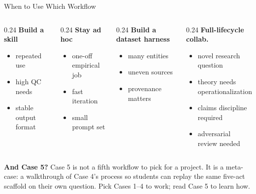 \documentclass[10pt,english,aspectratio=169]{beamer}
\begin{document}
\begin{frame}{When to Use Which Workflow}
\begin{columns}[T]
\begin{column}{0.24\textwidth}
\textbf{Build a skill}
\begin{itemize}\small
    \item repeated use
    \item high QC needs
    \item stable output format
\end{itemize}
\end{column}
\begin{column}{0.24\textwidth}
\textbf{Stay ad hoc}
\begin{itemize}\small
    \item one-off empirical job
    \item fast iteration
    \item small prompt set
\end{itemize}
\end{column}
\begin{column}{0.24\textwidth}
\textbf{Build a dataset harness}
\begin{itemize}\small
    \item many entities
    \item uneven sources
    \item provenance matters
\end{itemize}
\end{column}
\begin{column}{0.24\textwidth}
\textbf{Full-lifecycle collab.}
\begin{itemize}\small
    \item novel research question
    \item theory needs operationalization
    \item claims discipline required
    \item adversarial review needed
\end{itemize}
\end{column}
\end{columns}

\vspace{0.3cm}
\textbf{And Case 5?} Case 5 is not a fifth workflow to pick for a project. It is a meta-case: a walkthrough of Case 4's process so students can replay the same five-act scaffold on their own question. Pick Cases 1--4 to work; read Case 5 to learn how.
\end{frame}
\end{document}
